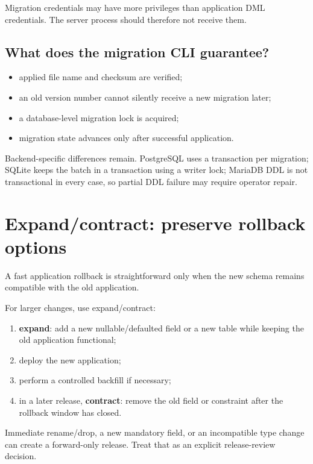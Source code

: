 Migration credentials may have more privileges than application DML credentials. The server process should therefore not receive them.

\subsection*{What does the migration CLI guarantee?}

\begin{itemize}
\item applied file name and checksum are verified;
\item an old version number cannot silently receive a new migration later;
\item a database-level migration lock is acquired;
\item migration state advances only after successful application.
\end{itemize}

Backend-specific differences remain. PostgreSQL uses a transaction per migration; SQLite keeps the batch in a transaction using a  writer lock; MariaDB DDL is not transactional in every case, so partial DDL failure may require operator repair.

\section{Expand/contract: preserve rollback options}

A fast application rollback is straightforward only when the new schema remains compatible with the old application.

For larger changes, use expand/contract:

\begin{enumerate}
\item \textbf{expand}: add a new nullable/defaulted field or a new table while keeping the old application functional;
\item deploy the new application;
\item perform a controlled backfill if necessary;
\item in a later release, \textbf{contract}: remove the old field or constraint after the rollback window has closed.
\end{enumerate}

Immediate rename/drop, a new mandatory field, or an incompatible type change can create a forward-only release. Treat that as an explicit release-review decision.

